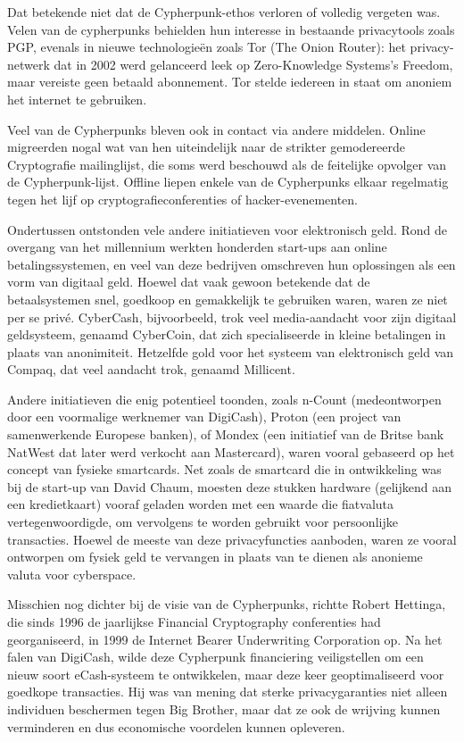 \documentclass[
  a5paper,
  smalldemyvopaper,11pt,twoside,onecolumn,openright,extrafontsizes]{memoir}
\begin{document}
Dat betekende niet dat de Cypherpunk-ethos verloren of volledig vergeten
was. Velen van de cypherpunks behielden hun interesse in bestaande
privacytools zoals PGP, evenals in nieuwe technologieën zoals Tor (The
Onion Router): het privacy-netwerk dat in 2002 werd gelanceerd leek op
Zero-Knowledge Systems's Freedom, maar vereiste geen betaald abonnement.
Tor stelde iedereen in staat om anoniem het internet te gebruiken.

Veel van de Cypherpunks bleven ook in contact via andere middelen.
Online migreerden nogal wat van hen uiteindelijk naar de strikter
gemodereerde Cryptografie mailinglijst, die soms werd beschouwd als de
feitelijke opvolger van de Cypherpunk-lijst. Offline liepen enkele van
de Cypherpunks elkaar regelmatig tegen het lijf op
cryptografieconferenties of hacker-evenementen.

Ondertussen ontstonden vele andere initiatieven voor elektronisch geld.
Rond de overgang van het millennium werkten honderden start-ups aan
online betalingssystemen, en veel van deze bedrijven omschreven hun
oplossingen als een vorm van digitaal geld. Hoewel dat vaak gewoon
betekende dat de betaalsystemen snel, goedkoop en gemakkelijk te
gebruiken waren, waren ze niet per se privé. CyberCash, bijvoorbeeld,
trok veel media-aandacht voor zijn digitaal geldsysteem, genaamd
CyberCoin, dat zich specialiseerde in kleine betalingen in plaats van
anonimiteit. Hetzelfde gold voor het systeem van elektronisch geld van
Compaq, dat veel aandacht trok, genaamd Millicent.

Andere initiatieven die enig potentieel toonden, zoals n-Count
(medeontworpen door een voormalige werknemer van DigiCash), Proton (een
project van samenwerkende Europese banken), of Mondex (een initiatief
van de Britse bank NatWest dat later werd verkocht aan Mastercard),
waren vooral gebaseerd op het concept van fysieke smartcards. Net zoals
de smartcard die in ontwikkeling was bij de start-up van David Chaum,
moesten deze stukken hardware (gelijkend aan een kredietkaart) vooraf
geladen worden met een waarde die fiatvaluta vertegenwoordigde, om
vervolgens te worden gebruikt voor persoonlijke transacties. Hoewel de
meeste van deze privacyfuncties aanboden, waren ze vooral ontworpen om
fysiek geld te vervangen in plaats van te dienen als anonieme valuta
voor cyberspace.

Misschien nog dichter bij de visie van de Cypherpunks, richtte Robert
Hettinga, die sinds 1996 de jaarlijkse Financial Cryptography
conferenties had georganiseerd, in 1999 de Internet Bearer Underwriting
Corporation op. Na het falen van DigiCash, wilde deze Cypherpunk
financiering veiligstellen om een nieuw soort eCash-systeem te
ontwikkelen, maar deze keer geoptimaliseerd voor goedkope transacties.
Hij was van mening dat sterke privacygaranties niet alleen individuen
beschermen tegen Big Brother, maar dat ze ook de wrijving kunnen
verminderen en dus economische voordelen kunnen opleveren.
\end{document}
